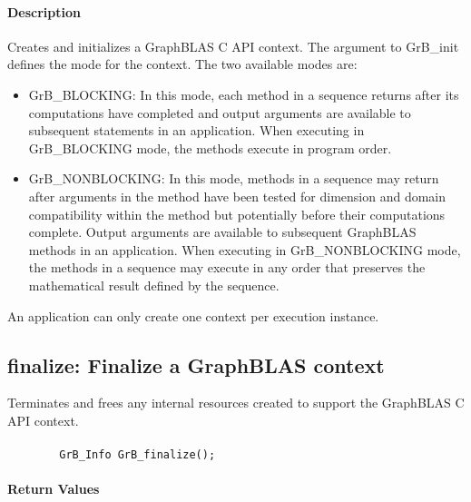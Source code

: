 \paragraph{Description}

Creates and initializes a GraphBLAS C API context.  The argument
to {\sf GrB\_init} defines the mode for the context.  The two
available modes are:

\begin{itemize}
\item {\sf GrB\_BLOCKING}: In this mode, each method in a sequence returns after 
its computations have completed and output arguments are available to
subsequent statements in an application.  When executing in {\sf
GrB\_BLOCKING} mode, the methods execute in program order.

\item {\sf GrB\_NONBLOCKING}: In this mode, methods in a sequence may return after arguments
in the method have been tested for dimension and domain compatibility
within the method but potentially before their computations complete.  Output
arguments are available to subsequent GraphBLAS methods in an application.
When executing in {\sf GrB\_NONBLOCKING} mode, the methods in a sequence
may execute in any order that preserves the mathematical result defined
by the sequence.
\end{itemize}

An application can only create one context per execution instance.

\subsection{{\sf finalize}: Finalize a GraphBLAS context}

Terminates and frees any internal resources created to support the
GraphBLAS C API context.

\paragraph{\syntax}

\begin{verbatim}
        GrB_Info GrB_finalize();
\end{verbatim}

\paragraph{Return Values}

